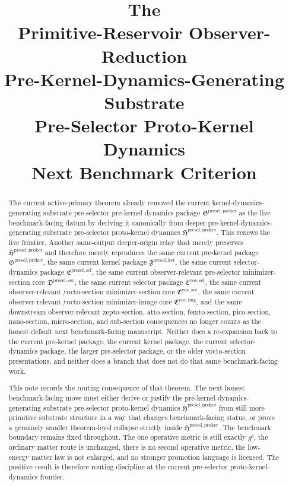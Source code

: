\documentclass[11pt]{article}
\title{\textbf{The \TheoryName{}}\\[0.4em]
\large Primitive-Reservoir Observer-Reduction\\
\large Pre-Kernel-Dynamics-Generating Substrate\\
\large Pre-Selector Proto-Kernel Dynamics\\
\large Next Benchmark Criterion}
\author{}
\date{}
\newcommand{\CompletedMetric}{g^{\sharp}}
\newcommand{\ProtoKernelPackage}{\mathfrak H^{\mathrm{presel,proker}}}
\newcommand{\PreKernelPackage}{\mathfrak G^{\mathrm{presel,preker}}}
\newcommand{\KernelPackage}{\mathfrak F^{\mathrm{presel,ker}}}
\newcommand{\PreSectionSelectorPackage}{\mathfrak E^{\mathrm{presel,sel}}}
\newcommand{\PreSelectorMinSectionCore}{\mathfrak D^{\mathrm{presel,sec}}}
\newcommand{\YoctoSelectorPackage}{\mathfrak C^{\mathrm{yoc,sel}}}
\newcommand{\YoctoImageCore}{\mathfrak C^{\mathrm{yoc,img}}}
\newcommand{\YoctoMinSectionCore}{\mathfrak C^{\mathrm{yoc,sec}}}
\begin{document}
\maketitle

\begin{abstract}
The current active-primary theorem already removed the current kernel-dynamics-generating substrate pre-selector pre-kernel dynamics package \(\PreKernelPackage\) as the live benchmark-facing datum by deriving it canonically from deeper pre-kernel-dynamics-generating substrate pre-selector proto-kernel dynamics \(\ProtoKernelPackage\). This renews the live frontier. Another same-output deeper-origin relay that merely preserves \(\ProtoKernelPackage\) and therefore merely reproduces the same current pre-kernel package \(\PreKernelPackage\), the same current kernel package \(\KernelPackage\), the same current selector-dynamics package \(\PreSectionSelectorPackage\), the same current observer-relevant pre-selector minimizer-section core \(\PreSelectorMinSectionCore\), the same current selector package \(\YoctoSelectorPackage\), the same current observer-relevant yocto-section minimizer-section core \(\YoctoMinSectionCore\), the same current observer-relevant yocto-section minimizer-image core \(\YoctoImageCore\), and the same downstream observer-relevant zepto-section, atto-section, femto-section, pico-section, nano-section, micro-section, and sub-section consequences no longer counts as the honest default next benchmark-facing manuscript. Neither does a re-expansion back to the current pre-kernel package, the current kernel package, the current selector-dynamics package, the larger pre-selector package, or the older yocto-section presentations, and neither does a branch that does not do that same benchmark-facing work.

This note records the routing consequence of that theorem. The next honest benchmark-facing move must either derive or justify the pre-kernel-dynamics-generating substrate pre-selector proto-kernel dynamics \(\ProtoKernelPackage\) from still more primitive substrate structure in a way that changes benchmark-facing status, or prove a genuinely smaller theorem-level collapse strictly inside \(\ProtoKernelPackage\). The benchmark boundary remains fixed throughout. The one operative metric is still exactly \(\CompletedMetric\), the ordinary matter route is unchanged, there is no second operative metric, the low-energy matter law is not enlarged, and no stronger promotion language is licensed. The positive result is therefore routing discipline at the current pre-selector proto-kernel-dynamics frontier.
\end{abstract}
\end{document}
